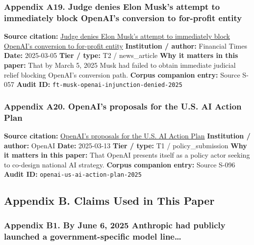 \documentclass[
  american,
  11pt,
  letterpaper,
]{article}
\begin{document}
\subsubsection{Appendix A19. Judge denies Elon Musk's attempt to
immediately block OpenAI's conversion to for-profit
entity}\label{appendix-a19-judge-denies-elon-musks-attempt-to-immediately-block-openais-conversion-to-for-profit-entity}

\textbf{Source citation:}
\href{https://www.ft.com/content/532931dd-e1c0-4f18-a8af-5777dd70a52d}{Judge
denies Elon Musk's attempt to immediately block OpenAI's conversion to
for-profit entity} \textbf{Institution / author:} Financial Times
\textbf{Date:} 2025-03-05 \textbf{Tier / type:} T2 / news\_article
\textbf{Why it matters in this paper:} That by March 5, 2025 Musk had
failed to obtain immediate judicial relief blocking OpenAI's conversion
path. \textbf{Corpus companion entry:} Source S-057 \textbf{Audit ID:}
\texttt{ft-musk-openai-injunction-denied-2025}

\subsubsection{Appendix A20. OpenAI's proposals for the U.S. AI Action
Plan}\label{appendix-a20-openais-proposals-for-the-us-ai-action-plan}

\textbf{Source citation:}
\href{https://openai.com/global-affairs/openai-proposals-for-the-us-ai-action-plan/}{OpenAI's
proposals for the U.S. AI Action Plan} \textbf{Institution / author:}
OpenAI \textbf{Date:} 2025-03-13 \textbf{Tier / type:} T1 /
policy\_submission \textbf{Why it matters in this paper:} That OpenAI
presents itself as a policy actor seeking to co-design national AI
strategy. \textbf{Corpus companion entry:} Source S-096 \textbf{Audit
ID:} \texttt{openai-us-ai-action-plan-2025}

\subsection{Appendix B. Claims Used in This
Paper}\label{appendix-b.-claims-used-in-this-paper}

\subsubsection{Appendix B1. By June 6, 2025 Anthropic had publicly
launched a government-specific model
line\ldots{}}\label{appendix-b1-by-june-6-2025-anthropic-had-publicly-launched-a-government-specific-model-line}
\end{document}
